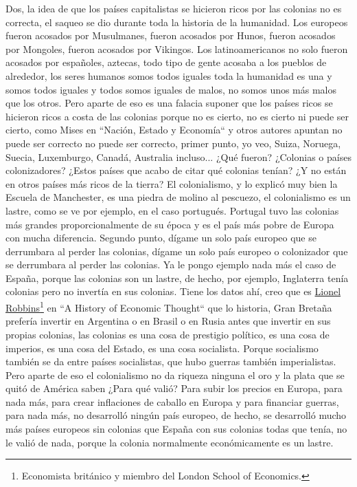 Dos, la idea de que los países capitalistas se hicieron ricos por las colonias no es correcta, el saqueo se dio durante toda la historia de la humanidad. Los europeos fueron acosados por Musulmanes, fueron acosados por Hunos, fueron acosados por Mongoles, fueron acosados por Vikingos. Los latinoamericanos no solo fueron acosados por españoles, aztecas, todo tipo de gente acosaba a los pueblos de alrededor, los seres humanos somos todos iguales toda la humanidad es una y somos todos iguales y todos somos iguales de malos, no somos unos más malos que los otros. Pero aparte de eso es una falacia suponer que los países ricos se hicieron ricos a costa de las colonias porque no es cierto, no es cierto ni puede ser cierto, como Mises en ``Nación, Estado y Economía``\cite{vonmises1919nation} y otros autores apuntan no puede ser correcto no puede ser correcto, primer punto, yo veo, Suiza, Noruega, Suecia, Luxemburgo, Canadá, Australia incluso... ¿Qué fueron? ¿Colonias o países colonizadores? ¿Estos países que acabo de citar qué colonias tenían? ¿Y no están en otros países más ricos de la tierra? El colonialismo, y lo explicó muy bien la Escuela de Manchester, es una piedra de molino al pescuezo, el colonialismo es un lastre, como se ve por ejemplo, en el caso portugués. Portugal tuvo las colonias más grandes proporcionalmente de su época y es el país más pobre de Europa con mucha diferencia. Segundo punto, dígame un solo país europeo que se derrumbara al perder las colonias, dígame un solo país europeo o colonizador que se derrumbara al perder las colonias. Ya le pongo ejemplo nada más el caso de España, porque las colonias son un lastre, de hecho, por ejemplo, Inglaterra tenía colonias pero no invertía en sus colonias. Tiene los datos ahí, creo que es \href{https://en.wikipedia.org/wiki/Lionel_Robbins}{Lionel Robbins}\footnote{Economista británico y miembro del London School of Economics.} en ``A History of Economic Thought``\cite{robbins1998history} que lo historia, Gran Bretaña prefería invertir en Argentina o en Brasil o en Rusia antes que invertir en sus propias colonias, las colonias es una cosa de prestigio político, es una cosa de imperios, es una cosa del Estado, es una cosa socialista. Porque socialismo también se da entre países socialistas, que hubo guerras también imperialistas. Pero aparte de eso el colonialismo no da riqueza ninguna el oro y la plata que se quitó de América saben ¿Para qué valió? Para subir los precios en Europa, para nada más, para crear inflaciones de caballo en Europa y para financiar guerras, para nada más, no desarrolló ningún país europeo, de hecho, se desarrolló mucho más países europeos sin colonias que España con sus colonias todas que tenía,
no le valió de nada, porque la colonia normalmente económicamente es un lastre.

